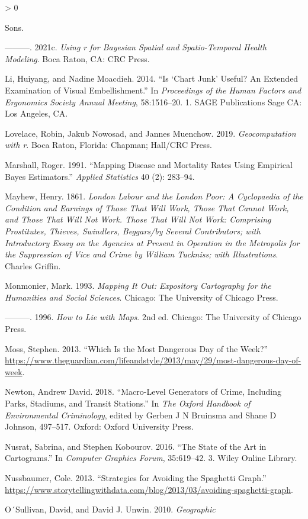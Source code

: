 \documentclass[
]{book}
\newlength{\cslhangindent}
\newenvironment{CSLReferences}[2] %
 {%
  \setlength{\parindent}{0pt}
  \ifodd #1 \everypar{\setlength{\hangindent}{\cslhangindent}}\ignorespaces\fi
  \ifnum #2 > 0
  \setlength{\parskip}{#2\baselineskip}
  \fi
 }%
 {}
\begin{document}
\begin{CSLReferences}{1}{0}
Sons.

\leavevmode\hypertarget{ref-Lawson_2021b}{}%
---------. 2021c. \emph{Using r for Bayesian Spatial and Spatio-Temporal Health Modeling}. Boca Raton, CA: CRC Press.

\leavevmode\hypertarget{ref-Li_2014}{}%
Li, Huiyang, and Nadine Moacdieh. 2014. {``Is {`Chart Junk'} Useful? An Extended Examination of Visual Embellishment.''} In \emph{Proceedings of the Human Factors and Ergonomics Society Annual Meeting}, 58:1516--20. 1. SAGE Publications Sage CA: Los Angeles, CA.

\leavevmode\hypertarget{ref-Lovelace_2019}{}%
Lovelace, Robin, Jakub Nowosad, and Jannes Muenchow. 2019. \emph{Geocomputation with r}. Boca Raton, Florida: Chapman; Hall/CRC Press.

\leavevmode\hypertarget{ref-Marshall_1991}{}%
Marshall, Roger. 1991. {``Mapping Disease and Mortality Rates Using Empirical Bayes Estimators.''} \emph{Applied Statistics} 40 (2): 283--94.

\leavevmode\hypertarget{ref-Mayhew_1861}{}%
Mayhew, Henry. 1861. \emph{London Labour and the London Poor: A Cyclopaedia of the Condition and Earnings of Those That Will Work, Those That Cannot Work, and Those That Will Not Work. Those That Will Not Work: Comprising Prostitutes, Thieves, Swindlers, Beggars/by Several Contributors; with Introductory Essay on the Agencies at Present in Operation in the Metropolis for the Suppression of Vice and Crime by William Tuckniss; with Illustrations}. Charles Griffin.

\leavevmode\hypertarget{ref-Monmonier_1993}{}%
Monmonier, Mark. 1993. \emph{Mapping It Out: Expository Cartography for the Humanities and Social Sciences}. Chicago: The University of Chicago Press.

\leavevmode\hypertarget{ref-Monmonier_1996}{}%
---------. 1996. \emph{How to Lie with Maps}. 2nd ed. Chicago: The University of Chicago Press.

\leavevmode\hypertarget{ref-Moss_2013}{}%
Moss, Stephen. 2013. {``Which Is the Most Dangerous Day of the Week?''} \url{https://www.theguardian.com/lifeandstyle/2013/may/29/most-dangerous-day-of-week}.

\leavevmode\hypertarget{ref-Newton_2018}{}%
Newton, Andrew David. 2018. {``Macro-Level Generators of Crime, Including Parks, Stadiums, and Transit Stations.''} In \emph{The Oxford Handbook of Environmental Criminology}, edited by Gerben J N Bruinsma and Shane D Johnson, 497--517. Oxford: Oxford University Press.

\leavevmode\hypertarget{ref-Nusrat_2016}{}%
Nusrat, Sabrina, and Stephen Kobourov. 2016. {``The State of the Art in Cartograms.''} In \emph{Computer Graphics Forum}, 35:619--42. 3. Wiley Online Library.

\leavevmode\hypertarget{ref-Nussbaumer_2013}{}%
Nussbaumer, Cole. 2013. {``Strategies for Avoiding the Spaghetti Graph.''} \url{https://www.storytellingwithdata.com/blog/2013/03/avoiding-spaghetti-graph}.

\leavevmode\hypertarget{ref-OSullivan_2010}{}%
O´Sullivan, David, and David J. Unwin. 2010. \emph{Geographic 
\end{CSLReferences}
\end{document}
